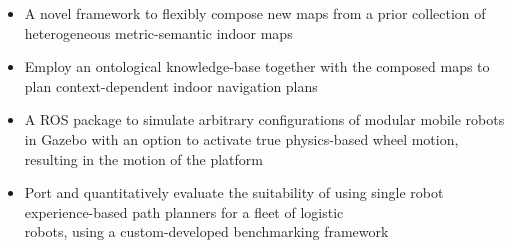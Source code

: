 \documentclass[10pt,a4paper,ragged2e]{altacv}
\begin{document}

\begin{itemize}
    \item A novel framework to flexibly compose new maps from a prior collection of heterogeneous metric-semantic indoor maps
    \item Employ an ontological knowledge-base together with the composed maps to plan context-dependent indoor navigation plans
\end{itemize}


\divider

\begin{itemize}
    \item A ROS package to simulate arbitrary configurations of modular mobile robots in Gazebo with an option to activate true physics-based wheel motion, resulting in the motion of the platform
\end{itemize}

\divider

\begin{itemize}
    \item Port and quantitatively evaluate the suitability of using single robot experience-based path planners for a fleet of logistic\\robots, using a custom-developed benchmarking framework
\end{itemize}

\end{document}
